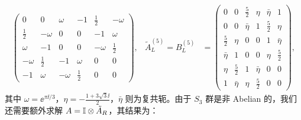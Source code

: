 \begin{align}
\begin{pmatrix}
    0 & 0 & \omega & -1 & \frac12 & -\omega \\
    \frac12 & -\omega & 0 & 0 & -1 & \omega \\
    \omega & -1 & 0 & 0 & -\omega & \frac12 \\
    -\omega & \frac12 & -1 & \omega & 0 & 0 \\
    -1 & \omega & -\omega & \frac12 & 0 & 0
  \end{pmatrix}, &
  \tilde{A}^{(5)}_L = B^{(5)}_L &= \begin{pmatrix}
    0 & 0 & \frac52 & \eta & \bar{\eta} & 1 \\
    0 & 0 & \bar{\eta} & 1 & \frac52 & \eta \\
    \frac52 & \eta & 0 & 0 & 1 & \bar{\eta} \\
    \bar{\eta} & 1 & 0 & 0 & \eta & \frac52 \\
    \eta & \frac52 & 1 & \bar{\eta} & 0 & 0 \\
    1 & \bar{\eta} & \eta & \frac52 & 0 & 0
  \end{pmatrix},
\end{align}
其中 $\omega=\ee^{\pi\ii/3}$，$\eta=-\frac{1+3\sqrt3\ii}{2}$，$\bar{\eta}$ 则为复共轭。由于 $S_3$ 群是非 Abelian 的，我们还需要额外求解 $A=\mathbb{I}\otimes\tilde{A}_R$，其结果为：
